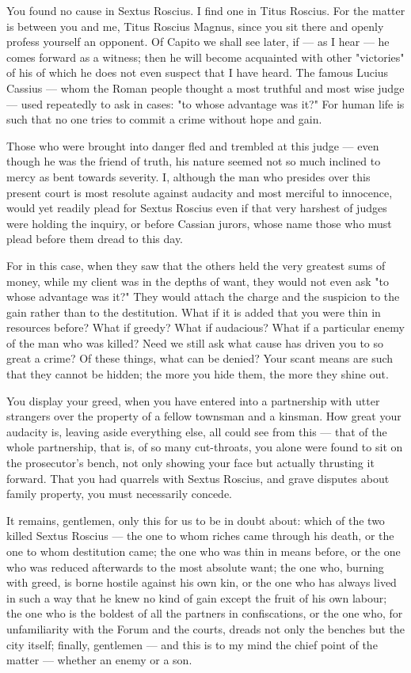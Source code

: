  You found no cause in Sextus Roscius. I find one in Titus Roscius. For the matter is between you and me, Titus Roscius Magnus, since you sit there and openly profess yourself an opponent. Of Capito we shall see later, if --- as I hear --- he comes forward as a witness; then he will become acquainted with other "victories" of his of which he does not even suspect that I have heard. The famous Lucius Cassius --- whom the Roman people thought a most truthful and most wise judge --- used repeatedly to ask in cases: "to whose advantage was it?" For human life is such that no one tries to commit a crime without hope and gain.

 Those who were brought into danger fled and trembled at this judge --- even though he was the friend of truth, his nature seemed not so much inclined to mercy as bent towards severity. I, although the man who presides over this present court is most resolute against audacity and most merciful to innocence, would yet readily plead for Sextus Roscius even if that very harshest of judges were holding the inquiry, or before Cassian jurors, whose name those who must plead before them dread to this day.

 For in this case, when they saw that the others held the very greatest sums of money, while my client was in the depths of want, they would not even ask "to whose advantage was it?" They would attach the charge and the suspicion to the gain rather than to the destitution. What if it is added that you were thin in resources before? What if greedy? What if audacious? What if a particular enemy of the man who was killed? Need we still ask what cause has driven you to so great a crime? Of these things, what can be denied? Your scant means are such that they cannot be hidden; the more you hide them, the more they shine out.

 You display your greed, when you have entered into a partnership with utter strangers over the property of a fellow townsman and a kinsman. How great your audacity is, leaving aside everything else, all could see from this --- that of the whole partnership, that is, of so many cut-throats, you alone were found to sit on the prosecutor's bench, not only showing your face but actually thrusting it forward. That you had quarrels with Sextus Roscius, and grave disputes about family property, you must necessarily concede.

 It remains, gentlemen, only this for us to be in doubt about: which of the two killed Sextus Roscius --- the one to whom riches came through his death, or the one to whom destitution came; the one who was thin in means before, or the one who was reduced afterwards to the most absolute want; the one who, burning with greed, is borne hostile against his own kin, or the one who has always lived in such a way that he knew no kind of gain except the fruit of his own labour; the one who is the boldest of all the partners in confiscations, or the one who, for unfamiliarity with the Forum and the courts, dreads not only the benches but the city itself; finally, gentlemen --- and this is to my mind the chief point of the matter --- whether an enemy or a son.

